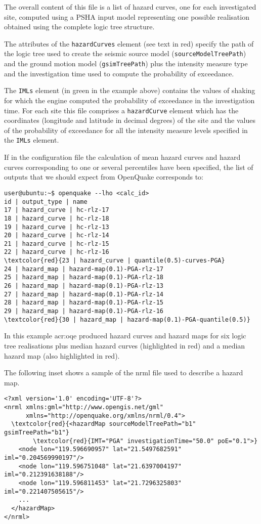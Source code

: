 The overall content of this file is a list of hazard curves, one for
each investigated site, computed using a PSHA input model representing
one possible realisation obtained using the complete logic tree structure. 

The attributes of the \texttt{hazardCurves} element (see text in 
red) specify the path of the logic tree 
used to create the seismic source model (\texttt{source\-Model\-TreePath}) 
and the ground motion model (\texttt{gsim\-Tree\-Path}) plus the 
intensity measure type and the investigation time used to compute 
the probability of exceedance. 

The \texttt{IMLs} element (in green in the example above) contains the 
values of shaking for which the engine computed the probability of 
exceedance in the investigation time.
For each site this file comprises a \texttt{hazardCurve} element which 
has the coordinates (longitude and latitude in decimal degrees) 
of the site and the values of the probability of exceedance for all the 
intensity measure levels specified in the \texttt{IMLs} element.

If in the configuration file the calculation of mean hazard curves 
and hazard curves corresponding to one or several percentiles have 
been specified, the list of outputs that we should expect from OpenQuake 
corresponds to:
\begin{Verbatim}[frame=single, commandchars=\\\{\}, fontsize=\small]
user@ubuntu:~$ openquake --lho <calc_id> 
id | output_type | name
17 | hazard_curve | hc-rlz-17
18 | hazard_curve | hc-rlz-18
19 | hazard_curve | hc-rlz-13
20 | hazard_curve | hc-rlz-14
21 | hazard_curve | hc-rlz-15
22 | hazard_curve | hc-rlz-16
\textcolor{red}{23 | hazard_curve | quantile(0.5)-curves-PGA}
24 | hazard_map | hazard-map(0.1)-PGA-rlz-17
25 | hazard_map | hazard-map(0.1)-PGA-rlz-18
26 | hazard_map | hazard-map(0.1)-PGA-rlz-13
27 | hazard_map | hazard-map(0.1)-PGA-rlz-14
28 | hazard_map | hazard-map(0.1)-PGA-rlz-15
29 | hazard_map | hazard-map(0.1)-PGA-rlz-16
\textcolor{red}{30 | hazard_map | hazard-map(0.1)-PGA-quantile(0.5)}
\end{Verbatim}
In this example \gls{acr:oqe} produced hazard curves and hazard maps for 
six logic tree realisations plus median hazard curves (highlighted in red)
and a median hazard map (also highlighted in red).

The following inset shows a sample of the nrml file used 
to describe a hazard map.
\begin{Verbatim}[frame=single, commandchars=\\\{\}, fontsize=\small]
<?xml version='1.0' encoding='UTF-8'?>
<nrml xmlns:gml="http://www.opengis.net/gml" 
      xmlns="http://openquake.org/xmlns/nrml/0.4">
  \textcolor{red}{<hazardMap sourceModelTreePath="b1" gsimTreePath="b1"}
        \textcolor{red}{IMT="PGA" investigationTime="50.0" poE="0.1">}
    <node lon="119.596690957" lat="21.5497682591" iml="0.204569990197"/>
    <node lon="119.596751048" lat="21.6397004197" iml="0.212391638188"/>
    <node lon="119.596811453" lat="21.7296325803" iml="0.221407505615"/>
    ...
  </hazardMap>
</nrml>
\end{Verbatim}